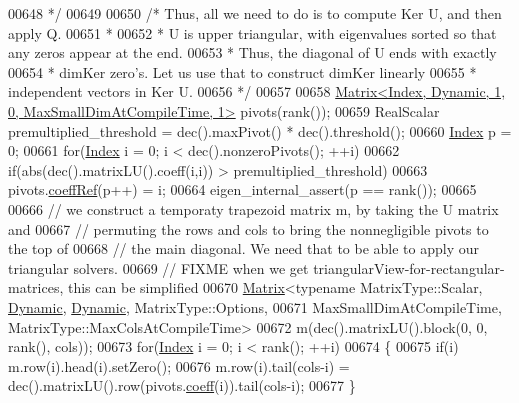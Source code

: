 \begin{DoxyCode}
00648 \textcolor{comment}{      */}
00649 
00650     \textcolor{comment}{/* Thus, all we need to do is to compute Ker U, and then apply Q.}
00651 \textcolor{comment}{      *}
00652 \textcolor{comment}{      * U is upper triangular, with eigenvalues sorted so that any zeros appear at the end.}
00653 \textcolor{comment}{      * Thus, the diagonal of U ends with exactly}
00654 \textcolor{comment}{      * dimKer zero's. Let us use that to construct dimKer linearly}
00655 \textcolor{comment}{      * independent vectors in Ker U.}
00656 \textcolor{comment}{      */}
00657 
00658     \hyperlink{group___core___module_class_eigen_1_1_matrix}{Matrix<Index, Dynamic, 1, 0, MaxSmallDimAtCompileTime, 1>}
       pivots(rank());
00659     RealScalar premultiplied\_threshold = dec().maxPivot() * dec().threshold();
00660     \hyperlink{group___core___module_a554f30542cc2316add4b1ea0a492ff02}{Index} p = 0;
00661     \textcolor{keywordflow}{for}(\hyperlink{group___core___module_a554f30542cc2316add4b1ea0a492ff02}{Index} i = 0; i < dec().nonzeroPivots(); ++i)
00662       \textcolor{keywordflow}{if}(abs(dec().matrixLU().coeff(i,i)) > premultiplied\_threshold)
00663         pivots.\hyperlink{class_eigen_1_1_plain_object_base_a25626a55b26a4323565f79d1b7c48ea8}{coeffRef}(p++) = i;
00664     eigen\_internal\_assert(p == rank());
00665 
00666     \textcolor{comment}{// we construct a temporaty trapezoid matrix m, by taking the U matrix and}
00667     \textcolor{comment}{// permuting the rows and cols to bring the nonnegligible pivots to the top of}
00668     \textcolor{comment}{// the main diagonal. We need that to be able to apply our triangular solvers.}
00669     \textcolor{comment}{// FIXME when we get triangularView-for-rectangular-matrices, this can be simplified}
00670     \hyperlink{group___core___module_class_eigen_1_1_matrix}{Matrix}<\textcolor{keyword}{typename} MatrixType::Scalar, \hyperlink{namespace_eigen_ad81fa7195215a0ce30017dfac309f0b2}{Dynamic}, \hyperlink{namespace_eigen_ad81fa7195215a0ce30017dfac309f0b2}{Dynamic}, MatrixType::Options,
00671            MaxSmallDimAtCompileTime, MatrixType::MaxColsAtCompileTime>
00672       m(dec().matrixLU().block(0, 0, rank(), cols));
00673     \textcolor{keywordflow}{for}(\hyperlink{group___core___module_a554f30542cc2316add4b1ea0a492ff02}{Index} i = 0; i < rank(); ++i)
00674     \{
00675       \textcolor{keywordflow}{if}(i) m.row(i).head(i).setZero();
00676       m.row(i).tail(cols-i) = dec().matrixLU().row(pivots.\hyperlink{class_eigen_1_1_plain_object_base_afbfc12954f16d21aedb7bd839f64a278}{coeff}(i)).tail(cols-i);
00677     \}

\end{DoxyCode}
